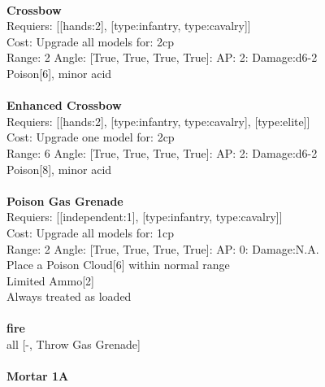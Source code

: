\ \\
{\bf Crossbow } \\

Requiers: [[hands:2], [type:infantry, type:cavalry]] \\
Cost: Upgrade all models for: 2cp \\


Range: 2  Angle: [True, True, True, True]: AP: 2: Damage:d6-2 \\
Poison[6], minor acid\\ 








\ \\
{\bf Enhanced Crossbow } \\

Requiers: [[hands:2], [type:infantry, type:cavalry], [type:elite]] \\
Cost: Upgrade one model for: 2cp \\


Range: 6  Angle: [True, True, True, True]: AP: 2: Damage:d6-2 \\
Poison[8], minor acid\\ 








\ \\
{\bf Poison Gas Grenade } \\

Requiers: [[independent:1], [type:infantry, type:cavalry]] \\
Cost: Upgrade all models for: 1cp \\


Range: 2  Angle: [True, True, True, True]: AP: 0: Damage:N.A. \\
Place a Poison Cloud[6] within normal range\\ 
Limited Ammo[2]\\ 
Always treated as loaded\\ 







\ \\ {\bf fire } \\
all [-, Throw Gas Grenade] \\

\ \\
{\bf Mortar 1A } \\

